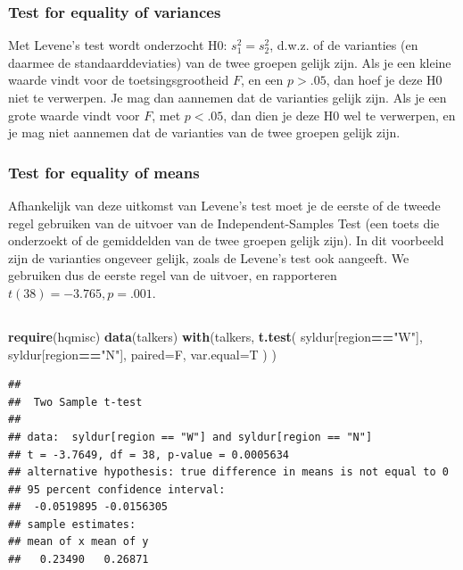 \documentclass[
]{book}
\newenvironment{Shaded}{\begin{snugshade}}{\end{snugshade}}
\newcommand{\DataTypeTok}[1]{\textcolor[rgb]{0.13,0.29,0.53}{#1}}
\newcommand{\KeywordTok}[1]{\textcolor[rgb]{0.13,0.29,0.53}{\textbf{#1}}}
\newcommand{\NormalTok}[1]{#1}
\newcommand{\OperatorTok}[1]{\textcolor[rgb]{0.81,0.36,0.00}{\textbf{#1}}}
\newcommand{\StringTok}[1]{\textcolor[rgb]{0.31,0.60,0.02}{#1}}
\begin{document}
\hypertarget{test-for-equality-of-variances}{%
\subsubsection{Test for equality of variances}\label{test-for-equality-of-variances}}

Met Levene's test wordt onderzocht H0: \(s^2_1 = s^2_2\), d.w.z. of de
varianties (en daarmee de standaarddeviaties) van de twee groepen gelijk
zijn. Als je een kleine waarde vindt voor de toetsingsgrootheid \(F\), en
een \(p>.05\), dan hoef je deze H0 niet te verwerpen. Je mag dan aannemen
dat de varianties gelijk zijn. Als je een grote waarde vindt voor \(F\),
met \(p<.05\), dan dien je deze H0 wel te verwerpen, en je mag niet
aannemen dat de varianties van de twee groepen gelijk zijn.

\hypertarget{test-for-equality-of-means}{%
\subsubsection{Test for equality of means}\label{test-for-equality-of-means}}

Afhankelijk van deze uitkomst van Levene's test moet je de eerste of de
tweede regel gebruiken van de uitvoer van de Independent-Samples Test
(een toets die onderzoekt of de gemiddelden van de twee groepen gelijk
zijn). In dit voorbeeld zijn de varianties ongeveer gelijk, zoals de
Levene's test ook aangeeft. We gebruiken dus de eerste regel van de
uitvoer, en rapporteren \(t(38)=-3.765, p=.001\).

\hypertarget{sec:R-ttoets-ongepaard}{%
\subsection{}\label{sec:R-ttoets-ongepaard}}

\begin{Shaded}
\begin{Highlighting}[]
\KeywordTok{require}\NormalTok{(hqmisc)}
\KeywordTok{data}\NormalTok{(talkers)}
\KeywordTok{with}\NormalTok{(talkers, }\KeywordTok{t.test}\NormalTok{( syldur[region}\OperatorTok{==}\StringTok{"W"}\NormalTok{], syldur[region}\OperatorTok{==}\StringTok{"N"}\NormalTok{], }
            \DataTypeTok{paired=}\NormalTok{F, }\DataTypeTok{var.equal=}\NormalTok{T ) )}
\end{Highlighting}
\end{Shaded}

\begin{verbatim}
## 
##  Two Sample t-test
## 
## data:  syldur[region == "W"] and syldur[region == "N"]
## t = -3.7649, df = 38, p-value = 0.0005634
## alternative hypothesis: true difference in means is not equal to 0
## 95 percent confidence interval:
##  -0.0519895 -0.0156305
## sample estimates:
## mean of x mean of y 
##   0.23490   0.26871
\end{verbatim}
\end{document}
